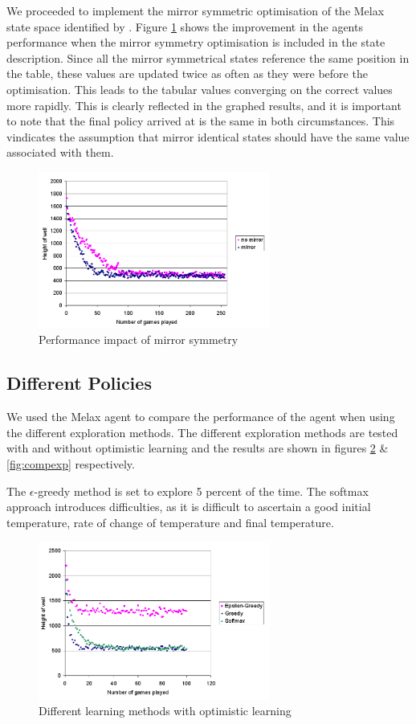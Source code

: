 \documentclass{rucsthesis}
\begin{document}
We proceeded to implement the mirror symmetric optimisation of the Melax state space identified by \cite{yaeltetris}. Figure \ref{fig:comparemelax} shows the improvement in the agents performance when the mirror symmetry optimisation is included in the state description. Since all the mirror symmetrical states reference the same position in the table, these values are updated twice as often as they were before the optimisation. This leads to the tabular values converging on the correct values more rapidly. This is clearly reflected in the graphed results, and it is important to note that the final policy arrived at is the same in both circumstances. This vindicates the assumption that mirror identical states should have the same value associated with them.

\begin{figure}[h]
\centering
\includegraphics[width=3in]{mirrormelax.png}
\caption{Performance impact of mirror symmetry}
\label{fig:comparemelax}
\end{figure}

\subsection{Different Policies}

We used the Melax agent to compare the performance of the agent when using the different exploration methods. The different exploration methods are tested with and without optimistic learning and the results are shown in figures \ref{fig:compexpopt} \& \ref{fig:compexp} respectively.

The $\epsilon$-greedy method is set to explore 5 percent of the time. The softmax approach introduces difficulties, as it is difficult to ascertain a good initial temperature, rate of change of temperature and final temperature.

\begin{figure}[h]
\centering
\includegraphics[width=3in]{optomisticexp.png}
\caption{Different learning methods with optimistic learning}
\label{fig:compexpopt}
\end{figure}
\end{document}
